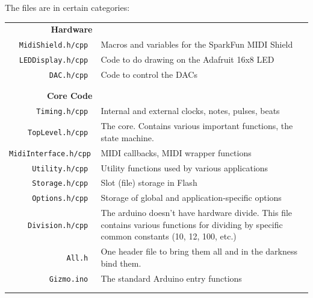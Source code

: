 \documentclass{article}
\begin{document}
The files are in certain categories:

\noindent\begin{tabular}{r@{\hspace{2em}}p{4.7in}}
	\bf Hardware &\\
	\tt MidiShield.h/cpp	& Macros and variables for the SparkFun MIDI Shield \\ 
	\tt LEDDisplay.h/cpp	& Code to do drawing on the Adafruit 16x8 LED \\ 
	\tt DAC.h/cpp		& Code to control the DACs \\ 
\\
\\
	\bf Core Code  &\\
	\tt Timing.h/cpp	& 	Internal and external clocks, notes, pulses, beats \\ 
	\tt TopLevel.h/cpp	& 	The core.  Contains various important functions, the state machine. \\ 
	\tt MidiInterface.h/cpp	& MIDI callbacks, MIDI wrapper functions \\ 
	\tt Utility.h/cpp		& Utility functions used by various applications \\ 
	\tt Storage.h/cpp		& Slot (file) storage in Flash \\ 
	\tt Options.h/cpp		& Storage of global and application-specific options \\ 
	\tt Division.h/cpp		& The arduino doesn't have hardware divide.  This
				file contains various functions for dividing by
				specific common constants (10, 12, 100, etc.) \\ 
	\tt All.h		& 	One header file to bring them all and in the
				darkness bind them. \\ 
	\tt Gizmo.ino		& The standard Arduino entry functions \\ 
\\
\\


\end{tabular}
\end{document}

